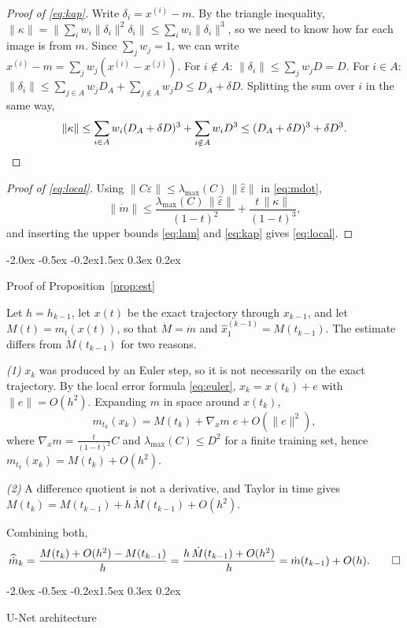 \documentclass{article}
\makeatletter
\renewcommand{\section}{\@startsection{section}{1}{\z@}%
  {-2.0ex \@plus -0.5ex \@minus -0.2ex}{1.5ex \@plus 0.3ex \@minus 0.2ex}{\large\bfseries\raggedright}}
\theoremstyle{remark}
\newcommand{\xn}[1]{x^{(#1)}}
\newcommand{\eps}{\hat\varepsilon}
\newcommand{\lmax}{\lambda_{\max}}
\makeatother
\begin{document}
\begin{proof}[Proof of \eqref{eq:kap}]
Write $\delta_i = \xn{i} - m$. By the triangle inequality, $\|\kappa\| = \big\|\sum_iw_i\|\delta_i\|^2\delta_i\big\| \le \sum_iw_i\|\delta_i\|^3$, so we need to know how far each image is from $m$. Since $\sum_jw_j = 1$, we can write $\xn{i} - m = \sum_jw_j(\xn{i} - \xn{j})$. For $i \notin A$: $\|\delta_i\| \le \sum_jw_jD = D$. For $i \in A$: $\|\delta_i\| \le \sum_{j \in A}w_jD_A + \sum_{j \notin A}w_jD \le D_A + \delta D$. Splitting the sum over $i$ in the same way,
\[
  \|\kappa\| \le \sum_{i \in A}w_i(D_A + \delta D)^3 + \sum_{i \notin A}w_iD^3 \le (D_A + \delta D)^3 + \delta D^3 .\qedhere
\]
\end{proof}

\begin{proof}[Proof of \eqref{eq:local}]
Using $\|C\eps\| \le \lmax(C)\,\|\eps\|$ in \eqref{eq:mdot},
\[
  \|\dot m\| \le \frac{\lmax(C)\,\|\eps\|}{(1 - t)^2} + \frac{t\,\|\kappa\|}{(1 - t)^3},
\]
and inserting the upper bounds \eqref{eq:lam} and \eqref{eq:kap} gives \eqref{eq:local}.
\end{proof}

\section{Proof of Proposition~\ref{prop:est}}\label{app:est}

Let $h = h_{k - 1}$, let $x(t)$ be the exact trajectory through $x_{k - 1}$, and let $M(t) = m_t(x(t))$, so that $\dot M = \dot m$ and $\hat x_1^{(k - 1)} = M(t_{k - 1})$. The estimate differs from $\dot M(t_{k - 1})$ for two reasons.

\emph{(1)} $x_k$ was produced by an Euler step, so it is not necessarily on the exact trajectory. By the local error formula \eqref{eq:euler}, $x_k = x(t_k) + e$ with $\|e\| = O(h^2)$. Expanding $m$ in space around $x(t_k)$,
\[
  m_{t_k}(x_k) = M(t_k) + \nabla_xm\;e + O(\|e\|^2),
\]
where $\nabla_xm = \frac{t}{(1 - t)^2}C$ and $\lmax(C) \le D^2$ for a finite training set, hence $m_{t_k}(x_k) = M(t_k) + O(h^2)$.

\emph{(2)} A difference quotient is not a derivative, and Taylor in time gives $M(t_k) = M(t_{k - 1}) + h\,\dot M(t_{k - 1}) + O(h^2)$.

Combining both,
\[
  \widehat{\dot m}_k = \frac{M(t_k) + O(h^2) - M(t_{k - 1})}{h} = \frac{h\,\dot M(t_{k - 1}) + O(h^2)}{h} = \dot m(t_{k - 1}) + O(h). \qed
\]

\section{U-Net architecture}\label{app:unet}
\end{document}
